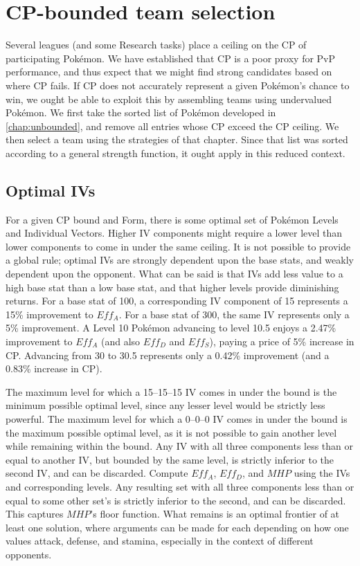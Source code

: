 \chapter{CP-bounded team selection}
\label{chap:bounded}
Several leagues (and some Research tasks) place a ceiling on the CP of
 participating Pokémon.
We have established that CP is a poor proxy for PvP performance, and thus
 expect that we might find strong candidates based on where CP fails.
If CP does not accurately represent a given Pokémon's chance to win, we ought
 be able to exploit this by assembling teams using undervalued Pokémon.
We first take the sorted list of Pokémon developed in \autoref{chap:unbounded},
 and remove all entries whose CP exceed the CP ceiling.
We then select a team using the strategies of that chapter. Since
 that list was sorted according to a general strength function, it
 ought apply in this reduced context.

\section{Optimal IVs}
For a given CP bound and Form, there is some optimal set of Pokémon Levels
 and Individual Vectors.
Higher IV components might require a lower level than lower components to
 come in under the same ceiling.
It is not possible to provide a global rule; optimal IVs are strongly
 dependent upon the base stats, and weakly dependent upon the opponent.
What can be said is that IVs add less value to a high base stat than a low
 base stat, and that higher levels provide diminishing returns.
For a base stat of 100, a corresponding IV component of 15 represents a
 15\% improvement to $Eff_A$.
For a base stat of 300, the same IV represents only a 5\% improvement.
A Level 10 Pokémon advancing to level 10.5 enjoys a 2.47\% improvement to
 $Eff_A$ (and also $Eff_D$ and $Eff_S$), paying a price of 5\% increase
 in CP.
Advancing from 30 to 30.5 represents only a 0.42\% improvement (and a
 0.83\% increase in CP).

The maximum level for which a 15--15--15 IV comes in under the bound is the
 minimum possible optimal level, since any lesser level would be strictly less
 powerful.
The maximum level for which a 0--0--0 IV comes in under the bound is the
 maximum possible optimal level, as it is not possible to gain another level
 while remaining within the bound.
Any IV with all three components less than or equal to another IV, but bounded
 by the same level, is strictly inferior to the second IV, and can be discarded.
Compute $Eff_A$, $Eff_D$, and $MHP$ using the IVs and corresponding levels.
Any resulting set with all three components less than or equal to some other set's
 is strictly inferior to the second, and can be discarded.
This captures $MHP$'s floor function.
What remains is an optimal frontier of at least one solution,
 where arguments can be made for each depending on how one values attack,
 defense, and stamina, especially in the context of different opponents.

